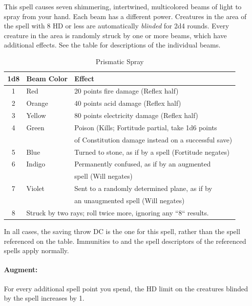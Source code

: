This spell causes seven shimmering, intertwined, multicolored beams of light to spray from your hand. 
Each beam has a different power. 
Creatures in the area of the spell with 8 HD or less are automatically \emph{blinded} for 2d4 rounds. 
Every creature in the area is randomly struck by one or more beams, which have additional effects.
See the  table for descriptions of the individual beams.
\begin{table}
\caption{Prismatic Spray}
\label{tab:PrismaticSpray}
\begin{center}
\begin{tabular}{|c|lp{8cm}|}%
\hline
1d8&Beam Color&Effect\\
\hline
1&Red&20 points fire damage (Reflex half)\\
2&Orange&40 points acid damage (Reflex half)\\
3&Yellow&80 points electricity damage (Reflex half)\\
4&Green&Poison (Kills; Fortitude partial, take 1d6 points\\
&& of Constitution damage instead on a successful save)\\
5&Blue&Turned to stone, as if by a \nameref{Spell:TransmuteFleshAndStone} spell (Fortitude negates)\\
6&Indigo&Permanently confused, as if by an augmented\\
&&\nameref{Spell:Confusion} spell (Will negates)\\
7&Violet&Sent to a randomly determined plane, as if by\\
&& an unaugmented \nameref{Spell:PlaneShift} spell (Will negates)\\
8&\multicolumn{2}{l|}{Struck by two rays; roll twice more, ignoring any ``8`` results.}\\
\hline
\end{tabular}
\end{center}
\end{table}
In all cases, the saving throw DC is the one for this spell, rather than the spell referenced on the table.
Immunities to and the spell descriptors of the referenced spells apply normally.

\paragraph{Augment:} For every additional spell point you spend, the HD limit on the creatures blinded by the spell increases by 1.
